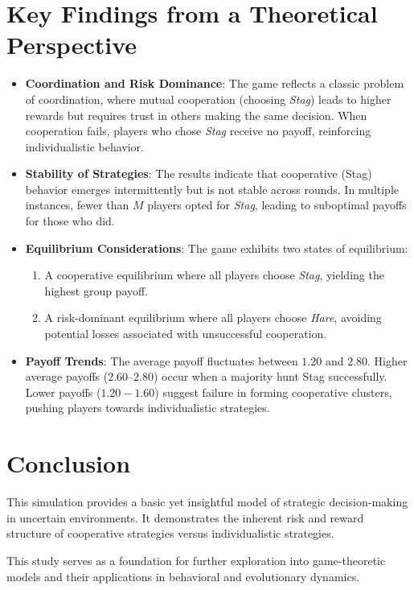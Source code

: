\documentclass{article}
\begin{document}
\section{Key Findings from a Theoretical Perspective}
\begin{itemize}
\item \textbf{Coordination and Risk Dominance}: The game reflects a classic  problem of coordination, where mutual cooperation (choosing \textit{Stag}) leads to higher rewards but requires trust in others making the same decision. When cooperation fails, players who chose \textit{Stag} receive no payoff, reinforcing individualistic behavior.
\item \textbf{Stability of Strategies}: The results indicate that cooperative (Stag) behavior emerges intermittently but is not stable across rounds. In multiple instances, fewer than $M$ players opted for \textit{Stag}, leading to suboptimal payoffs for those who did.
\item \textbf{Equilibrium Considerations}: The game exhibits two states of equilibrium:
\begin{enumerate}
\item A cooperative equilibrium where all players choose \textit{Stag}, yielding the highest group payoff.
\item A risk-dominant equilibrium where all players choose \textit{Hare}, avoiding potential losses associated with unsuccessful cooperation.
\end{enumerate}
\item \textbf{Payoff Trends}: The average payoff fluctuates between $1.20$ and $2.80$. Higher average payoffs ($2.60–2.80$) occur when a majority hunt Stag successfully. Lower payoffs ($1.20-1.60$) suggest failure in forming cooperative clusters, pushing players towards individualistic strategies.
\end{itemize}

\section{Conclusion}
This simulation provides a basic yet insightful model of strategic decision-making in uncertain environments. It demonstrates the inherent risk and reward structure of cooperative strategies versus individualistic strategies.

This study serves as a foundation for further exploration into game-theoretic models and their applications in behavioral and evolutionary dynamics.
\end{document}
